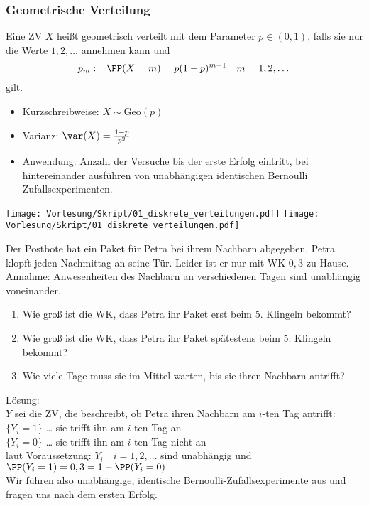 \documentclass{scrreprt}
\renewenvironment{anumerate}{\begin{enumerate}[label=(\alph*)]}{\end{enumerate}} %
\begin{document}
\subsubsection{Geometrische Verteilung}
 Eine ZV $X$ heißt geometrisch verteilt mit dem Parameter $p\in (0,1)$, falls sie nur die Werte $1,2,\dots$ annehmen kann und 
$$p_m:=\PP(X=m)=p(1-p)^{m-1} \quad m=1,2,\dots$$
gilt.
\begin{itemize}
\item Kurzschreibweise: $X\sim \mathrm{Geo}(p)$
\item Varianz: $\var(X)=\frac{1-p}{p^2}$
\item Anwendung: Anzahl der Versuche bis der erste Erfolg eintritt, bei hintereinander ausführen von unabhängigen identischen Bernoulli Zufallsexperimenten.
\end{itemize}
\begin{center}
\texttt{[image: Vorlesung/Skript/01\_diskrete\_verteilungen.pdf]}
\texttt{[image: Vorlesung/Skript/01\_diskrete\_verteilungen.pdf]}
\end{center}

 Der Postbote hat ein Paket für Petra bei ihrem Nachbarn abgegeben. Petra klopft jeden Nachmittag an seine Tür. Leider ist er nur mit WK $0,3$ zu Hause. Annahme: Anwesenheiten des Nachbarn an verschiedenen Tagen sind unabhängig voneinander. 
\begin{anumerate}
\item Wie groß ist die WK, dass Petra ihr Paket erst beim 5. Klingeln bekommt?
\item Wie groß ist die WK, dass Petra ihr Paket spätestens beim 5. Klingeln bekommt?
\item Wie viele Tage muss sie im Mittel warten, bis sie ihren Nachbarn antrifft?
\end{anumerate} 
Lösung:\\
$Y$ sei die ZV, die beschreibt, ob Petra ihren Nachbarn am $i$-ten Tag antrifft:\\
$\{Y_i=1\}$ … sie trifft ihn am $i$-ten Tag an\\
$\{Y_i=0\}$ … sie trifft ihn am $i$-ten Tag nicht an\\
laut Voraussetzung: $Y_i \quad i=1,2, \dots$ sind unabhängig und $\PP(Y_i=1) = 0,3 = 1-\PP(Y_i=0)$\\
Wir führen also unabhängige, identische Bernoulli-Zufallsexperimente aus und fragen uns nach dem ersten Erfolg.
\end{document}
